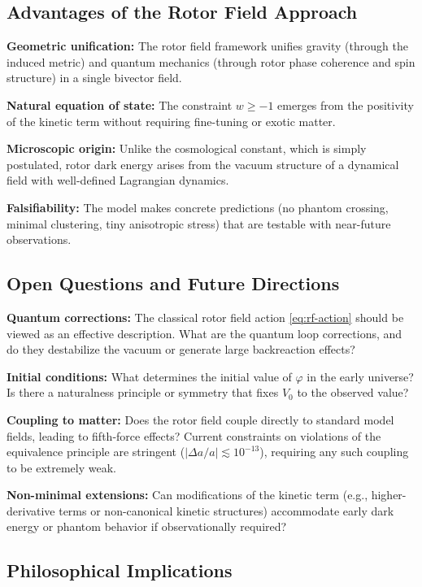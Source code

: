 \documentclass[11pt,a4paper]{article}
\numberwithin{equation}{section}
\theoremstyle{plain}
\theoremstyle{definition}
\theoremstyle{remark}
\begin{document}
\subsection{Advantages of the Rotor Field Approach}

\textbf{Geometric unification:} The rotor field framework unifies gravity (through the induced metric) and quantum mechanics (through rotor phase coherence and spin structure) in a single bivector field.

\textbf{Natural equation of state:} The constraint $w \geq -1$ emerges from the positivity of the kinetic term without requiring fine-tuning or exotic matter.

\textbf{Microscopic origin:} Unlike the cosmological constant, which is simply postulated, rotor dark energy arises from the vacuum structure of a dynamical field with well-defined Lagrangian dynamics.

\textbf{Falsifiability:} The model makes concrete predictions (no phantom crossing, minimal clustering, tiny anisotropic stress) that are testable with near-future observations.

\subsection{Open Questions and Future Directions}

\textbf{Quantum corrections:} The classical rotor field action \eqref{eq:rf-action} should be viewed as an effective description. What are the quantum loop corrections, and do they destabilize the vacuum or generate large backreaction effects?

\textbf{Initial conditions:} What determines the initial value of $\varphi$ in the early universe? Is there a naturalness principle or symmetry that fixes $V_0$ to the observed value?

\textbf{Coupling to matter:} Does the rotor field couple directly to standard model fields, leading to fifth-force effects? Current constraints on violations of the equivalence principle are stringent ($|\Delta a/a| \lesssim 10^{-13}$), requiring any such coupling to be extremely weak.

\textbf{Non-minimal extensions:} Can modifications of the kinetic term (e.g., higher-derivative terms or non-canonical kinetic structures) accommodate early dark energy or phantom behavior if observationally required?

\subsection{Philosophical Implications}
\end{document}
